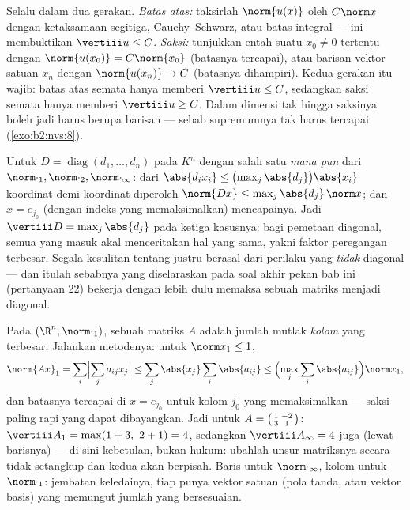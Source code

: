 \begin{method}\label{met:b2:nvs:opnorm}
Selalu dalam dua gerakan. \emph{Batas atas:} taksirlah
$\norm{u(x)}$ oleh $C\norm x$ dengan ketaksamaan segitiga,
Cauchy--Schwarz, atau batas integral --- ini membuktikan $\vertiii u
\leq C$. \emph{Saksi:} tunjukkan entah suatu $x_0 \neq 0$ tertentu
dengan $\norm{u(x_0)} = C\norm{x_0}$ (batasnya tercapai), atau
barisan vektor satuan $x_n$ dengan $\norm{u(x_n)} \to C$ (batasnya
dihampiri). Kedua gerakan itu wajib: batas atas semata hanya memberi
$\vertiii u \leq C$, sedangkan saksi semata hanya memberi
$\vertiii u \geq C$. Dalam dimensi tak hingga saksinya boleh jadi harus
berupa barisan --- sebab supremumnya tak harus tercapai
(\cref{exo:b2:nvs:8}).
\end{method}

\begin{example}\label{ex:b2:nvs:diagonalnorm}
Untuk $D = \operatorname{diag}(d_1, \dots, d_n)$ pada $K^n$ dengan
salah satu \emph{mana pun} dari  $\norm\cdot_1, \norm\cdot_2,
\norm\cdot_\infty$: dari $\abs{d_ix_i} \leq
\bigl(\max_j\abs{d_j}\bigr)\abs{x_i}$ koordinat demi koordinat diperoleh
$\norm{Dx} \leq \max_j\abs{d_j}\,\norm x$; dan $x = e_{j_0}$
(dengan indeks yang memaksimalkan) mencapainya. Jadi $\vertiii D =
\max_j\abs{d_j}$ pada ketiga kasusnya: bagi pemetaan diagonal, semua
 yang masuk akal menceritakan hal yang sama, yakni faktor
peregangan terbesar. Segala kesulitan tentang  justru
berasal dari perilaku yang \emph{tidak} diagonal --- dan itulah sebabnya
 yang diselaraskan pada soal akhir pekan bab ini (pertanyaan 22)
bekerja dengan lebih dulu memaksa sebuah matriks menjadi diagonal.
\end{example}

\begin{example}\label{ex:b2:nvs:columnsums}
Pada $(\R^n, \norm\cdot_1)$,  sebuah matriks $A$ adalah
jumlah mutlak \emph{kolom} yang terbesar. Jalankan metodenya: untuk
$\norm x_1 \leq 1$,
\[
\norm{Ax}_1 = \sum_i\Bigl|\sum_j a_{ij}x_j\Bigr|
\leq \sum_j \abs{x_j}\sum_i\abs{a_{ij}}
\leq \Bigl(\max_j\sum_i\abs{a_{ij}}\Bigr)\norm x_1 ,
\]
dan batasnya tercapai di $x = e_{j_0}$ untuk kolom $j_0$ yang
memaksimalkan --- saksi paling rapi yang dapat dibayangkan. Jadi untuk $A =
\begin{psmallmatrix}1 & -2\\ 3 & 1\end{psmallmatrix}$:
$\vertiii A_1 = \max(1 + 3,\ 2 + 1) = 4$, sedangkan
$\vertiii A_\infty = 4$ juga (lewat barisnya) --- di sini kebetulan, bukan
hukum: ubahlah unsur matriksnya secara tidak setangkup dan kedua
 akan berpisah. Baris untuk $\norm\cdot_\infty$, kolom untuk
$\norm\cdot_1$: jembatan keledainya, tiap  punya vektor satuan
(pola tanda, atau vektor basis) yang memungut jumlah yang bersesuaian.
\end{example}

